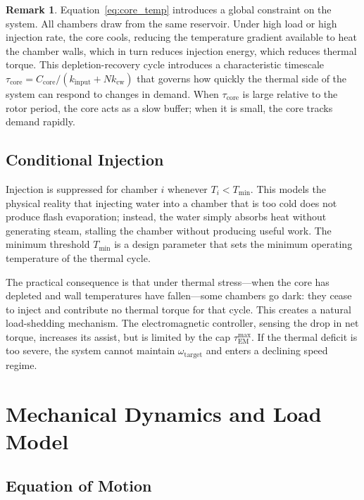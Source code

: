 \documentclass[11pt, a4paper]{article}
\theoremstyle{plain}
\theoremstyle{definition}
\newtheorem{remark}[theorem]{Remark}
\newcommand{\tauEM}{\tau_{\mathrm{EM}}}
\newcommand{\om}{\omega}
\newcommand{\Nch}{N}
\begin{document}
\begin{remark}
Equation~\eqref{eq:core_temp} introduces a global constraint on the system. All chambers draw from the same reservoir. Under high load or high injection rate, the core cools, reducing the temperature gradient available to heat the chamber walls, which in turn reduces injection energy, which reduces thermal torque. This depletion-recovery cycle introduces a characteristic timescale $\tau_{\mathrm{core}} = C_{\mathrm{core}} / (k_{\mathrm{input}} + \Nch k_{\mathrm{cw}})$ that governs how quickly the thermal side of the system can respond to changes in demand. When $\tau_{\mathrm{core}}$ is large relative to the rotor period, the core acts as a slow buffer; when it is small, the core tracks demand rapidly.
\end{remark}

\subsection{Conditional Injection}

Injection is suppressed for chamber $i$ whenever $T_i < T_{\mathrm{min}}$. This models the physical reality that injecting water into a chamber that is too cold does not produce flash evaporation; instead, the water simply absorbs heat without generating steam, stalling the chamber without producing useful work. The minimum threshold $T_{\mathrm{min}}$ is a design parameter that sets the minimum operating temperature of the thermal cycle.

The practical consequence is that under thermal stress---when the core has depleted and wall temperatures have fallen---some chambers go dark: they cease to inject and contribute no thermal torque for that cycle. This creates a natural load-shedding mechanism. The electromagnetic controller, sensing the drop in net torque, increases its assist, but is limited by the cap $\tauEM^{\mathrm{max}}$. If the thermal deficit is too severe, the system cannot maintain $\om_{\mathrm{target}}$ and enters a declining speed regime.

\section{Mechanical Dynamics and Load Model}
\label{sec:mechanical}

\subsection{Equation of Motion}
\end{document}
